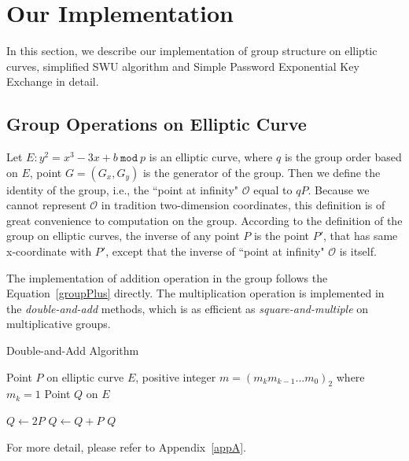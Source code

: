 \section{Our Implementation}
In this section, we describe our implementation of group structure on elliptic
curves, simplified SWU algorithm and Simple Password Exponential Key Exchange
in detail.
\subsection{Group Operations on Elliptic Curve}
Let $E: y^2 = x^3  - 3x + b\ \texttt{mod}\ p$ is an elliptic curve, where $q$ is
the group order based on $E$, point $G = (G_x, G_y)$ is the generator of the
group. Then we define the identity of the group, i.e., the ``point at
infinity" $\mathcal{O}$ equal to $qP$. Because we cannot represent
$\mathcal{O}$ in tradition two-dimension coordinates, this definition is of 
great convenience to computation on the group. According to the definition of the group on
elliptic curves,
the inverse of any point $P$ is the point $P'$, that has same x-coordinate 
with $P'$, except that the inverse of ``point at infinity" $\mathcal{O}$ is 
itself. 
\par The implementation of addition operation in the group follows the
Equation~\ref{groupPlus} directly. The multiplication operation is implemented in the 
\emph{double-and-add} methods, which is as efficient as
\emph{square-and-multiple} on multiplicative groups.
\begin{algorithm} 
\caption{Double-and-Add Algorithm}
  \begin{algorithmic}[1]
    \Require Point $P$ on elliptic curve $E$, positive integer $m =
(m_km_{k-1}...m_0)_2$ where $m_k = 1$
    \Ensure Point $Q$ on $E$

      \State $Q \gets 2P$
         \State $Q \gets Q + P$
      \EndIf
    \EndFor
    \State \Return $Q$
  \end{algorithmic}
\end{algorithm}
For more detail, please refer to Appendix~\ref{appA}.


